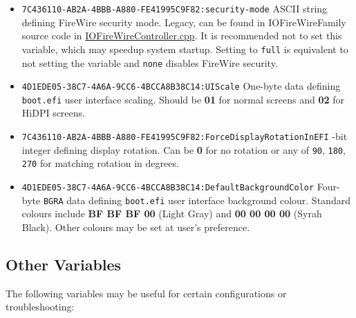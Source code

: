 \documentclass[]{article}
\begin{document}
\begin{itemize}
  will not enable ABC keyboard, unlike previous and subsequent macOS versions, and is thus not recommended in case 10.14 is needed.
\item
  \texttt{7C436110-AB2A-4BBB-A880-FE41995C9F82:security-mode}
  \break
  ASCII string defining FireWire security mode. Legacy, can be found in IOFireWireFamily
  source code in
  \href{https://opensource.apple.com/source/IOFireWireFamily/IOFireWireFamily-473/IOFireWireFamily.kmodproj/IOFireWireController.cpp.auto.html}{IOFireWireController.cpp}.
  It is recommended not to set this variable, which may speedup system startup. Setting to
  \texttt{full} is equivalent to not setting the variable and \texttt{none} disables
  FireWire security.
\item
  \texttt{4D1EDE05-38C7-4A6A-9CC6-4BCCA8B38C14:UIScale}
  \break
  One-byte data defining \texttt{boot.efi} user interface scaling. Should be \textbf{01} for normal
  screens and \textbf{02} for HiDPI screens.
\item
  \texttt{7C436110-AB2A-4BBB-A880-FE41995C9F82:ForceDisplayRotationInEFI}
  -bit integer defining display rotation. Can be \textbf{0} for no rotation
  or any of \texttt{90}, \texttt{180}, \texttt{270} for matching rotation in degrees.
\item
  \texttt{4D1EDE05-38C7-4A6A-9CC6-4BCCA8B38C14:DefaultBackgroundColor}
  \break
  Four-byte \texttt{BGRA} data defining \texttt{boot.efi} user interface background colour.
  Standard colours include \textbf{BF BF BF 00} (Light Gray) and \textbf{00 00 00 00}
  (Syrah Black). Other colours may be set at user's preference.
\end{itemize}

\subsection{Other Variables}\label{nvramvarsother}

The following variables may be useful for certain configurations or
troubleshooting:
\end{document}
